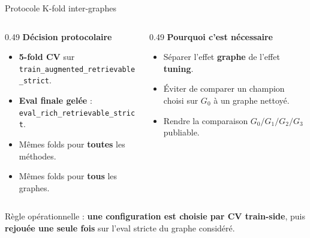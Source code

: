 \documentclass[aspectratio=169,10pt]{beamer}
\newcommand{\keybox}[1]{%
  \begin{center}
  \colorbox{accentsoft}{\parbox{0.92\linewidth}{\centering #1}}
  \end{center}}
\begin{document}
\begin{frame}{Protocole K-fold inter-graphes}
  \footnotesize
  \begin{columns}[T,onlytextwidth]
    \begin{column}{0.49\textwidth}
      \textbf{Décision protocolaire}
      \begin{itemize}\setlength{\itemsep}{0.3em}
        \item \textbf{5-fold CV} sur \texttt{train\_augmented\_retrievable\_strict}.
        \item \textbf{Eval finale gelée} : \texttt{eval\_rich\_retrievable\_strict}.
        \item Mêmes folds pour \textbf{toutes} les méthodes.
        \item Mêmes folds pour \textbf{tous} les graphes.
      \end{itemize}
    \end{column}
    \begin{column}{0.49\textwidth}
      \textbf{Pourquoi c'est nécessaire}
      \begin{itemize}\setlength{\itemsep}{0.3em}
        \item Séparer l'effet \textbf{graphe} de l'effet \textbf{tuning}.
        \item Éviter de comparer un champion choisi sur $G_0$ à un graphe nettoyé.
        \item Rendre la comparaison \textbf{$G_0/G_1/G_2/G_3$} publiable.
      \end{itemize}
    \end{column}
  \end{columns}

  \vspace{0.6em}
  \keybox{\scriptsize Règle opérationnelle : \textbf{une configuration est choisie par CV train-side},
  puis \textbf{rejouée une seule fois} sur l'eval stricte du graphe considéré.}
\end{frame}
\end{document}

